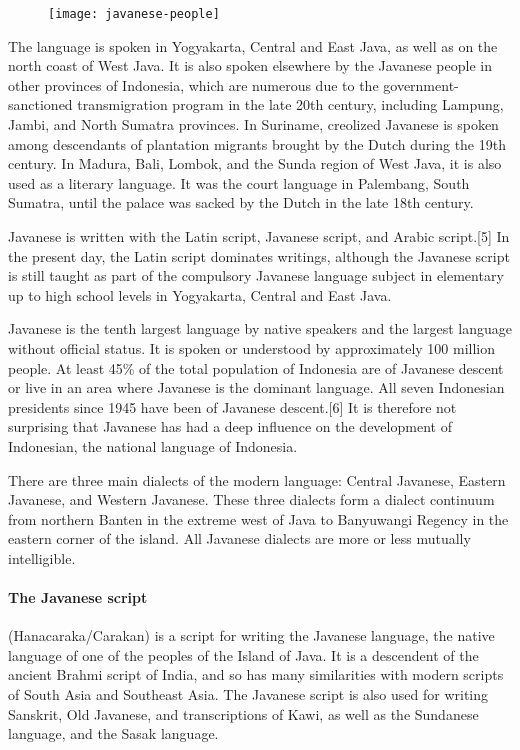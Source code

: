 \begin{figure}[htbp]
\texttt{[image: javanese-people]}
\end{figure}

The language is spoken in Yogyakarta, Central and East Java, as well as on the north coast of West Java. It is also spoken elsewhere by the Javanese people in other provinces of Indonesia, which are numerous due to the government-sanctioned transmigration program in the late 20th century, including Lampung, Jambi, and North Sumatra provinces. In Suriname, creolized Javanese is spoken among descendants of plantation migrants brought by the Dutch during the 19th century. In Madura, Bali, Lombok, and the Sunda region of West Java, it is also used as a literary language. It was the court language in Palembang, South Sumatra, until the palace was sacked by the Dutch in the late 18th century.

Javanese is written with the Latin script, Javanese script, and Arabic script.[5] In the present day, the Latin script dominates writings, although the Javanese script is still taught as part of the compulsory Javanese language subject in elementary up to high school levels in Yogyakarta, Central and East Java.

Javanese is the tenth largest language by native speakers and the largest language without official status. It is spoken or understood by approximately 100 million people. At least 45\% of the total population of Indonesia are of Javanese descent or live in an area where Javanese is the dominant language. All seven Indonesian presidents since 1945 have been of Javanese descent.[6] It is therefore not surprising that Javanese has had a deep influence on the development of Indonesian, the national language of Indonesia.

There are three main dialects of the modern language: Central Javanese, Eastern Javanese, and Western Javanese. These three dialects form a dialect continuum from northern Banten in the extreme west of Java to Banyuwangi Regency in the eastern corner of the island. All Javanese dialects are more or less mutually intelligible.


\paragraph{The Javanese script} (Hanacaraka/Carakan) is a script for writing the Javanese language, the native language of one of the peoples of the Island of Java. It is a descendent of the ancient Brahmi script of India, and so has many similarities with modern scripts of South Asia and Southeast Asia. The Javanese script is also used for writing Sanskrit, Old Javanese, and transcriptions of Kawi, as well as the Sundanese language, and the Sasak language.

